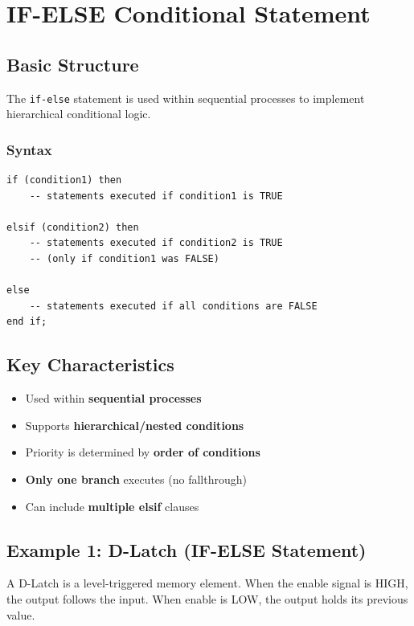 \documentclass[12pt,a4paper]{article}
\begin{document}
\section{IF-ELSE Conditional Statement}

\subsection{Basic Structure}

The \texttt{if-else} statement is used within sequential processes to implement hierarchical conditional logic.

\subsubsection{Syntax}
\begin{lstlisting}
if (condition1) then
    -- statements executed if condition1 is TRUE
    
elsif (condition2) then
    -- statements executed if condition2 is TRUE
    -- (only if condition1 was FALSE)
    
else
    -- statements executed if all conditions are FALSE
end if;
\end{lstlisting}

\subsection{Key Characteristics}
\begin{itemize}
    \item Used within \textbf{sequential processes}
    \item Supports \textbf{hierarchical/nested conditions}
    \item Priority is determined by \textbf{order of conditions}
    \item \textbf{Only one branch} executes (no fallthrough)
    \item Can include \textbf{multiple elsif} clauses
\end{itemize}

\subsection{Example 1: D-Latch (IF-ELSE Statement)}

A D-Latch is a level-triggered memory element. When the enable signal is HIGH, the output follows the input. When enable is LOW, the output holds its previous value.
\end{document}
